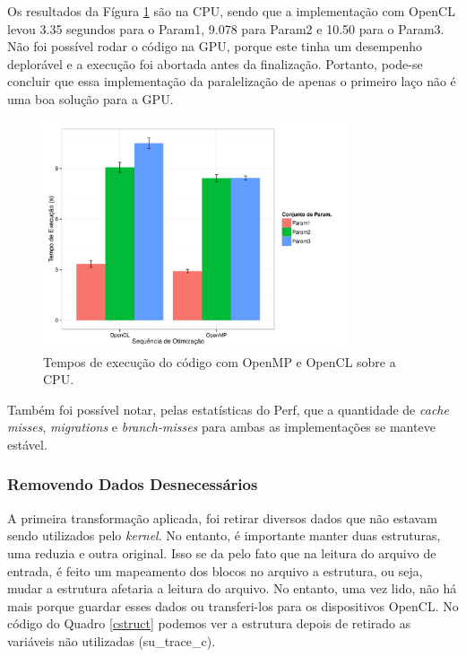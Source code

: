 \documentclass[12pt]{article}
\begin{document}
Os resultados da Fígura \ref{fgcl} são na CPU, sendo que a implementação com OpenCL levou 3.35 segundos para o Param1, 9.078 para Param2 e 10.50 para o Param3. Não foi possível rodar o código na GPU, porque este tinha um desempenho deplorável e a execução foi abortada antes da finalização. Portanto, pode-se concluir que essa implementação da paralelização de apenas o primeiro laço não é uma boa solução para a GPU. 

\begin{figure}[H]
\centering
\includegraphics[width=0.8\textwidth]{ocl.pdf}
\caption{Tempos de execução do código com OpenMP e OpenCL sobre a CPU.}
\label{fgcl}
\end{figure}

Também foi possível notar, pelas estatísticas do Perf, que a quantidade de \textit{cache misses}, \textit{migrations} e \textit{branch-misses} para ambas as implementações se manteve estável.

\subsubsection{Removendo Dados Desnecessários}

A primeira transformação aplicada, foi retirar diversos dados que não estavam sendo utilizados pelo \textit{kernel}. No entanto, é importante manter duas estruturas, uma reduzia e outra original. Isso se da pelo fato que na leitura do arquivo de entrada, é feito um mapeamento dos blocos no arquivo a estrutura, ou seja, mudar a estrutura afetaria a leitura do arquivo. No entanto, uma vez lido, não há mais porque guardar esses dados ou transferi-los para os dispositivos OpenCL. No código do Quadro \ref{cstruct} podemos ver a estrutura depois de retirado as variáveis não utilizadas (su\_trace\_c). \\
\end{document}
